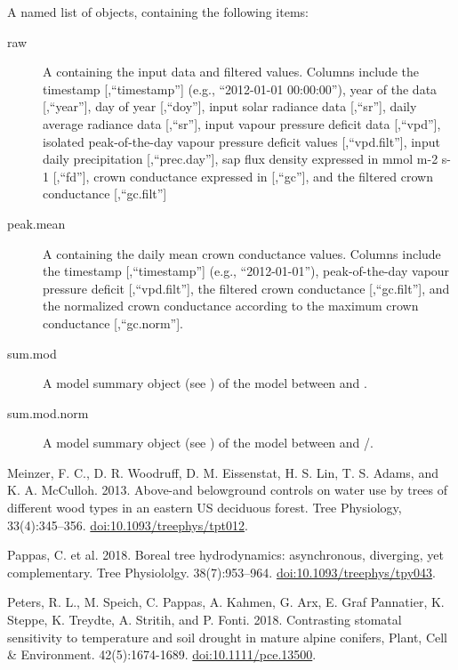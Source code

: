 \documentclass[a4paper]{book}
\begin{document}
\begin{Value}
A named list of  objects,
containing the following items:

\begin{description}

\item[raw] A  containing the input data and filtered values. Columns include the timestamp [,“timestamp”]
(e.g., “2012-01-01 00:00:00”), year of the data [,“year”], day of year [,“doy”], input solar radiance data [,“sr”],
daily average radiance data [,“sr”], input vapour pressure deficit data [,“vpd”], isolated peak-of-the-day vapour pressure
deficit values [,“vpd.filt”], input daily precipitation [,“prec.day”], sap flux density expressed in mmol m-2 s-1 [,“fd”],
crown conductance expressed in  [,“gc”], and the filtered crown conductance [,“gc.filt”]

\item[peak.mean] A  containing the daily mean crown conductance values.
Columns include the timestamp [,“timestamp”] (e.g., “2012-01-01”), peak-of-the-day vapour pressure deficit [,“vpd.filt”],
the filtered crown conductance  [,“gc.filt”],
and the normalized crown conductance according
to the maximum crown conductance [,“gc.norm”].

\item[sum.mod] A model summary object (see )
of the model between  and .


\item[sum.mod.norm] A model summary object (see )
of the model between  and /.




\end{description}

\end{Value}
%
\begin{References}\relax
Meinzer, F. C., D. R. Woodruff, D. M. Eissenstat,
H. S. Lin, T. S. Adams, and K. A. McCulloh. 2013. Above-and belowground controls on water use by
trees of different wood types in an eastern US deciduous forest.
Tree Physiology, 33(4):345–356. \url{doi:10.1093/treephys/tpt012}.

Pappas, C. et al. 2018. Boreal tree hydrodynamics: asynchronous, diverging, yet complementary.
Tree Physiololgy. 38(7):953–964. \url{doi:10.1093/treephys/tpy043}.

Peters, R. L., M. Speich, C. Pappas, A. Kahmen, G. Arx, E. Graf Pannatier,
K. Steppe, K. Treydte, A. Stritih, and P. Fonti. 2018.
Contrasting stomatal sensitivity to temperature and soil drought in mature
alpine conifers, Plant, Cell \& Environment. 42(5):1674-1689. \url{doi:10.1111/pce.13500}.
\end{References}
\end{document}
